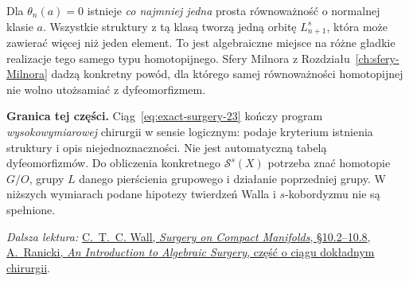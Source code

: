 \begin{przyklad}
\label{prz:nonunique-structure-23}
Dla $\theta_n(a)=0$ istnieje
\emph{co najmniej jedna} prosta równoważność
o normalnej klasie $a$. Wszystkie
struktury z tą klasą tworzą jedną orbitę
$L_{n+1}^s$, która może zawierać
więcej niż jeden element.
To jest algebraiczne miejsce na różne
gładkie realizacje tego samego typu
homotopijnego. Sfery Milnora z
Rozdziału~\ref{ch:sfery-Milnora}
dadzą konkretny powód, dla którego
samej równoważności homotopijnej
nie wolno utożsamiać z dyfeomorfizmem.
\end{przyklad}

\noindent\textbf{Granica tej części.}
Ciąg~\eqref{eq:exact-surgery-23} kończy
program \emph{wysokowymiarowej} chirurgii
w sensie logicznym: podaje kryterium
istnienia struktury i opis niejednoznaczności.
Nie jest automatyczną tabelą dyfeomorfizmów.
Do obliczenia konkretnego $\mathcal S^s(X)$
potrzeba znać homotopie $G/O$, grupy $L$
danego pierścienia grupowego i działanie
poprzedniej grupy. W niższych wymiarach
podane hipotezy twierdzeń Walla i
$s$-kobordyzmu nie są spełnione.

\par\smallskip
{\footnotesize\noindent\emph{Dalsza lektura:}
\href{https://webhomes.maths.ed.ac.uk/~v1ranick/books/scm.pdf}
{C.~T.~C. Wall, \emph{Surgery on Compact Manifolds}, §10.2--10.8},
\href{https://www.maths.ed.ac.uk/~v1ranick/surgery/ranicki.pdf}
{A.\ Ranicki, \emph{An Introduction to Algebraic Surgery},
część o ciągu dokładnym chirurgii}.\par}

\clearpage
